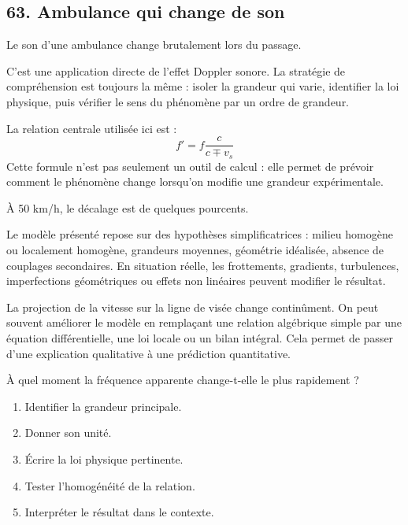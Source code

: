 \documentclass[11pt,a4paper]{article}
\begin{document}
\subsection{63. Ambulance qui change de son}

\begin{exemplebox}
Le son d'une ambulance change brutalement lors du passage.
\end{exemplebox}

\begin{methodebox}
C'est une application directe de l'effet Doppler sonore.
La stratégie de compréhension est toujours la même : isoler la grandeur qui varie, identifier la loi physique, puis vérifier le sens du phénomène par un ordre de grandeur.
\end{methodebox}

\begin{theorembox}
La relation centrale utilisée ici est :
\[
f'=f\frac{c}{c\mp v_s}
\]
Cette formule n'est pas seulement un outil de calcul : elle permet de prévoir comment le phénomène change lorsqu'on modifie une grandeur expérimentale.
\end{theorembox}

\begin{odgbox}
À 50 km/h, le décalage est de quelques pourcents.
\end{odgbox}

\begin{attentionbox}
Le modèle présenté repose sur des hypothèses simplificatrices : milieu homogène ou localement homogène, grandeurs moyennes, géométrie idéalisée, absence de couplages secondaires. En situation réelle, les frottements, gradients, turbulences, imperfections géométriques ou effets non linéaires peuvent modifier le résultat.
\end{attentionbox}

\begin{approfondissementbox}
La projection de la vitesse sur la ligne de visée change continûment.
On peut souvent améliorer le modèle en remplaçant une relation algébrique simple par une équation différentielle, une loi locale ou un bilan intégral. Cela permet de passer d'une explication qualitative à une prédiction quantitative.
\end{approfondissementbox}

\begin{exercicebox}
À quel moment la fréquence apparente change-t-elle le plus rapidement ?
\begin{enumerate}
  \item Identifier la grandeur principale.
  \item Donner son unité.
  \item Écrire la loi physique pertinente.
  \item Tester l'homogénéité de la relation.
  \item Interpréter le résultat dans le contexte.
\end{enumerate}
\end{exercicebox}
\end{document}
